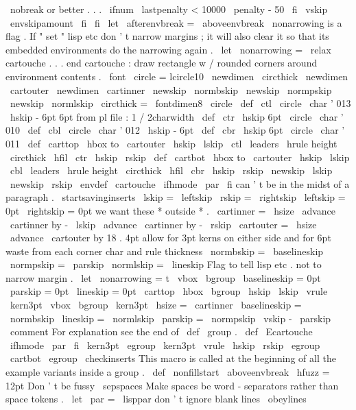 {{{\
nobreak
%
or
better
.
.
.
\
ifnum
\
lastpenalty
<
10000
\
penalty
-
50
\
fi
\
vskip
\
envskipamount
\
fi
\
fi
}
}
\
let
\
afterenvbreak
=
\
aboveenvbreak
%
\
nonarrowing
is
a
flag
.
If
"
set
"
lisp
etc
don
'
t
narrow
margins
;
it
will
%
also
clear
it
so
that
its
embedded
environments
do
the
narrowing
again
.
\
let
\
nonarrowing
=
\
relax
%
cartouche
.
.
.
end
cartouche
:
draw
rectangle
w
/
rounded
corners
around
%
environment
contents
.
\
font
\
circle
=
lcircle10
\
newdimen
\
circthick
\
newdimen
\
cartouter
\
newdimen
\
cartinner
\
newskip
\
normbskip
\
newskip
\
normpskip
\
newskip
\
normlskip
\
circthick
=
\
fontdimen8
\
circle
%
\
def
\
ctl
{
{
\
circle
\
char
'
013
\
hskip
-
6pt
}
}
%
6pt
from
pl
file
:
1
/
2charwidth
\
def
\
ctr
{
{
\
hskip
6pt
\
circle
\
char
'
010
}
}
\
def
\
cbl
{
{
\
circle
\
char
'
012
\
hskip
-
6pt
}
}
\
def
\
cbr
{
{
\
hskip
6pt
\
circle
\
char
'
011
}
}
\
def
\
carttop
{
\
hbox
to
\
cartouter
{
\
hskip
\
lskip
\
ctl
\
leaders
\
hrule
height
\
circthick
\
hfil
\
ctr
\
hskip
\
rskip
}
}
\
def
\
cartbot
{
\
hbox
to
\
cartouter
{
\
hskip
\
lskip
\
cbl
\
leaders
\
hrule
height
\
circthick
\
hfil
\
cbr
\
hskip
\
rskip
}
}
%
\
newskip
\
lskip
\
newskip
\
rskip
\
envdef
\
cartouche
{
%
\
ifhmode
\
par
\
fi
%
can
'
t
be
in
the
midst
of
a
paragraph
.
\
startsavinginserts
\
lskip
=
\
leftskip
\
rskip
=
\
rightskip
\
leftskip
=
0pt
\
rightskip
=
0pt
%
we
want
these
*
outside
*
.
\
cartinner
=
\
hsize
\
advance
\
cartinner
by
-
\
lskip
\
advance
\
cartinner
by
-
\
rskip
\
cartouter
=
\
hsize
\
advance
\
cartouter
by
18
.
4pt
%
allow
for
3pt
kerns
on
either
%
side
and
for
6pt
waste
from
%
each
corner
char
and
rule
thickness
\
normbskip
=
\
baselineskip
\
normpskip
=
\
parskip
\
normlskip
=
\
lineskip
%
Flag
to
tell
lisp
etc
.
not
to
narrow
margin
.
\
let
\
nonarrowing
=
t
%
\
vbox
\
bgroup
\
baselineskip
=
0pt
\
parskip
=
0pt
\
lineskip
=
0pt
\
carttop
\
hbox
\
bgroup
\
hskip
\
lskip
\
vrule
\
kern3pt
\
vbox
\
bgroup
\
kern3pt
\
hsize
=
\
cartinner
\
baselineskip
=
\
normbskip
\
lineskip
=
\
normlskip
\
parskip
=
\
normpskip
\
vskip
-
\
parskip
\
comment
%
For
explanation
see
the
end
of
\
def
\
group
.
}
\
def
\
Ecartouche
{
%
\
ifhmode
\
par
\
fi
\
kern3pt
\
egroup
\
kern3pt
\
vrule
\
hskip
\
rskip
\
egroup
\
cartbot
\
egroup
\
checkinserts
}
%
This
macro
is
called
at
the
beginning
of
all
the
example
variants
%
inside
a
group
.
\
def
\
nonfillstart
{
%
\
aboveenvbreak
\
hfuzz
=
12pt
%
Don
'
t
be
fussy
\
sepspaces
%
Make
spaces
be
word
-
separators
rather
than
space
tokens
.
\
let
\
par
=
\
lisppar
%
don
'
t
ignore
blank
lines
\
obeylines
}}
